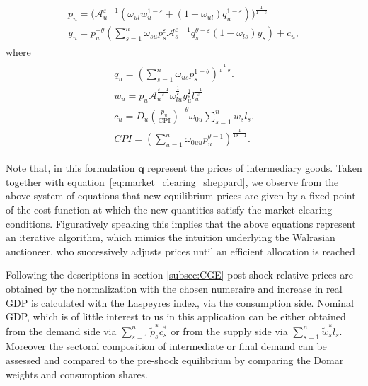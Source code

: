 \documentclass{article}
\newcommand{\post}[1]{#1^*}
\begin{document}
\begin{gather}
\begin{split}    
  p_u = \biggl( \mathcal A_u^{\varepsilon - 1} \left( \omega_{ul} w_u ^ {1 - \varepsilon} + (1 - \omega_{ul})  q_u ^ {1 - \varepsilon} \right) \biggr) ^ {\frac{1}{1 - \varepsilon}} \\
  y_u = p_u^{-\theta} \left(\sum_{s=1}^n \omega_{su}  p_s ^ {\varepsilon}  \mathcal A_s ^ {\varepsilon - 1} q_s ^ {\theta - \varepsilon}  (1 - \omega_{ls} )  y_s \right) +  c_u,
  \end{split}
\end{gather}
where 
\begin{gather}
\begin{split}
  q_u = \left( \sum_{s=1}^n \omega_{us}  p_s ^ {1 - \theta} \right) ^ {\frac{1}{1 - \theta}}. \\
  w_u = p_u \mathcal A_u ^ {\frac {\varepsilon - 1}{\varepsilon}} \omega_{lu} ^ {\frac{1}{\varepsilon}} y_u ^ {\frac{1}{\varepsilon}} l_u ^ {\frac {-1}{\varepsilon}} \\
  c_u = D_u \left( \frac{p_u}{\text{CPI}} \right)^ {-\theta} \omega_{0u} \sum_{s=1}^n w_s l_s. \\ CPI = \left( \sum_{u=1}^n \omega_{0uu} p_u^{\theta  -1} \right)^{\frac{1}{1\theta - 1}}.
  \end{split}
\end{gather}

Note that, in this formulation $\mathbf{q}$ represent the prices of intermediary goods. Taken together with equation~\eqref{eq:market_clearing_sheppard}, we observe from the above system of equations that new equilibrium prices are given by a fixed point of the cost function at which the new quantities satisfy the market clearing conditions. Figuratively speaking this implies that the above equations represent an iterative algorithm, which mimics the intuition underlying the Walrasian auctioneer, who successively adjusts prices until an efficient allocation is reached \citep{cardeneteAppliedGeneralEquilibrium2017}.

Following the descriptions in section \ref{subsec:CGE} post shock relative prices are obtained by the normalization with the chosen numeraire and increase in real GDP is calculated with the Laspeyres index, via the consumption side.  Nominal GDP, which is of little interest to us in this application can be either obtained from the demand side via $\sum_{s = 1}^n \post {\tilde p_s }\post c_s$ or from the supply side via $\sum_{s = 1}^n \post {\tilde w_s } l_s$. Moreover the sectoral composition of intermediate or final demand can be assessed and compared to the pre-shock equilibrium by comparing the Domar weights and consumption shares.
\end{document}
